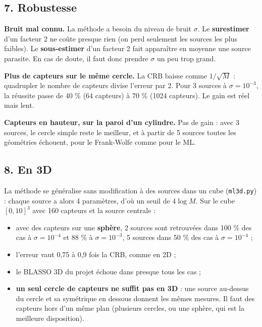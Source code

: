 \documentclass[
  french,
]{article}
\providecommand{\tightlist}{%
  \setlength{\itemsep}{0pt}\setlength{\parskip}{0pt}}
\begin{document}
\subsection{7. Robustesse}\label{robustesse}

\textbf{Bruit mal connu.} La méthode a besoin du niveau de bruit
\(\sigma\). Le \textbf{surestimer} d'un facteur 2 ne coûte presque rien
(on perd seulement les sources les plus faibles). Le
\textbf{sous-estimer} d'un facteur 2 fait apparaître en moyenne une
source parasite. En cas de doute, il faut donc prendre \(\sigma\) un peu
trop grand.

\textbf{Plus de capteurs sur le même cercle.} La CRB baisse comme
\(1/\sqrt M\) : quadrupler le nombre de capteurs divise l'erreur par 2.
Pour 3 sources à \(\sigma = 10^{-3}\), la réussite passe de 40 \% (64
capteurs) à 70 \% (1024 capteurs). Le gain est réel mais lent.

\textbf{Capteurs en hauteur, sur la paroi d'un cylindre.} Pas de gain :
avec 3 sources, le cercle simple reste le meilleur, et à partir de 5
sources toutes les géométries échouent, pour le Frank-Wolfe comme pour
le ML.

\subsection{8. En 3D}\label{en-3d}

La méthode se généralise sans modification à des sources dans un cube
(\texttt{ml3d.py}) : chaque source a alors 4 paramètres, d'où un seuil
de \(4\log M\). Sur le cube \([0,10]^3\) avec 160 capteurs et la source
centrale :

\begin{itemize}
\tightlist
\item
  avec des capteurs sur une \textbf{sphère}, 2 sources sont retrouvées
  dans 100 \% des cas à \(\sigma = 10^{-4}\) et 88 \% à
  \(\sigma = 10^{-3}\), 5 sources dans 50 \% des cas à
  \(\sigma = 10^{-4}\) ;
\item
  l'erreur vaut 0,75 à 0,9 fois la CRB, comme en 2D ;
\item
  le BLASSO 3D du projet échoue dans presque tous les cas ;
\item
  \textbf{un seul cercle de capteurs ne suffit pas en 3D} : une source
  au-dessus du cercle et sa symétrique en dessous donnent les mêmes
  mesures. Il faut des capteurs hors d'un même plan (plusieurs cercles,
  ou une sphère, qui est la meilleure disposition).
\end{itemize}
\end{document}
